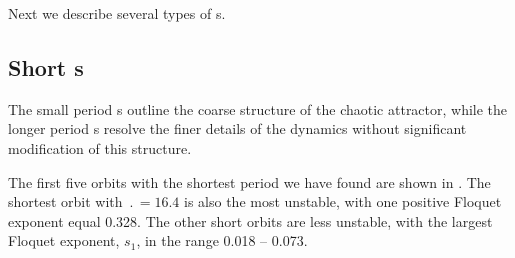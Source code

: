 Next we describe several types of \rpo s.

\subsection{Short \rpo s}  

The small period \rpo s outline the
coarse structure of the chaotic attractor, while the longer period
\rpo s resolve the finer details of the dynamics
without significant modification of this structure.

The first five orbits with the shortest period we have found are
shown in .  The shortest orbit with 
$\period{} = 16.4$ is also the most unstable, with one positive 
Floquet exponent equal 0.328.  The other short orbits are less 
unstable, with the largest Floquet exponent, $s_1$, in the range 
0.018 -- 0.073. 


